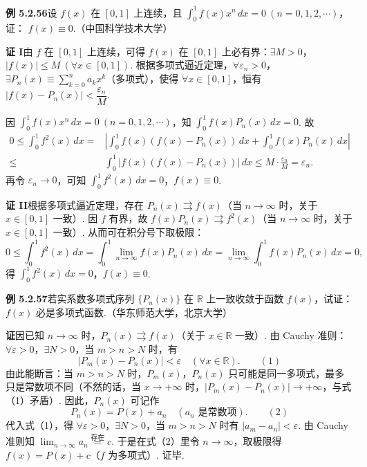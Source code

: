 \documentclass[UTF8, 12pt, fontset=fandol, oneside]{ctexart}
\begin{document}
\noindent\textbf{例 5.2.56}\quad 设 $f(x)$ 在 $[0,1]$ 上连续，且
$\displaystyle\int_0^1f(x)x^n\,dx=0\ (n=0,1,2,\cdots)$，证：
$f(x)\equiv0$.（中国科学技术大学）

\noindent\textbf{证 I}\quad 由 $f$ 在 $[0,1]$ 上连续，可得 $f(x)$ 在 $[0,1]$ 上必有界：$\exists M>0$，
$|f(x)|\le M\ (\forall x\in[0,1])$. 根据多项式逼近定理，$\forall\varepsilon_n>0$，
$\exists P_n(x)\equiv\displaystyle\sum_{k=0}^n a_kx^k$（多项式），使得 $\forall x\in[0,1]$，恒有
$|f(x)-P_n(x)|<\dfrac{\varepsilon_n}{M}$.

因 $\displaystyle\int_0^1f(x)x^n\,dx=0\ (n=0,1,2,\cdots)$，知
$\displaystyle\int_0^1f(x)P_n(x)\,dx=0$. 故
\[
\begin{aligned}
0\le\int_0^1f^2(x)\,dx
={}&\left|\int_0^1 f(x)(f(x)-P_n(x))\,dx+\int_0^1f(x)P_n(x)\,dx\right|\\
\le{}&\int_0^1|f(x)(f(x)-P_n(x))|\,dx
\le M\cdot\frac{\varepsilon_n}{M}=\varepsilon_n.
\end{aligned}
\]
再令 $\varepsilon_n\to0$，可知 $\displaystyle\int_0^1f^2(x)\,dx=0$，$f(x)\equiv0$.

\noindent\textbf{证 II}\quad 根据多项式逼近定理，存在 $P_n(x)\rightrightarrows f(x)$（当 $n\to\infty$ 时，关于
$x\in[0,1]$ 一致）. 因 $f$ 有界，故 $f(x)P_n(x)\rightrightarrows f^2(x)$（当 $n\to\infty$ 时，关于
$x\in[0,1]$ 一致）. 从而可在积分号下取极限：
\[
  0\le\int_0^1 f^2(x)\,dx
  =\int_0^1\lim_{n\to\infty}f(x)P_n(x)\,dx
  =\lim_{n\to\infty}\int_0^1f(x)P_n(x)\,dx=0,
\]
得 $\displaystyle\int_0^1f^2(x)\,dx=0$，$f(x)\equiv0$.

\noindent\textbf{例 5.2.57}\quad 若实系数多项式序列 $\{P_n(x)\}$ 在 $\mathbb R$ 上一致收敛于函数 $f(x)$，试证：
$f(x)$ 必是多项式函数.（华东师范大学，北京大学）

\noindent\textbf{证}\quad 因已知 $n\to\infty$ 时，$P_n(x)\rightrightarrows f(x)$（关于 $x\in\mathbb R$ 一致）. 由 Cauchy 准则：
$\forall\varepsilon>0$，$\exists N>0$，当 $m>n>N$ 时，有
\[
  |P_m(x)-P_n(x)|<\varepsilon\quad(\forall x\in\mathbb R).
\qquad(1)
\]
由此能断言：当 $m>n>N$ 时，$P_m(x)$，$P_n(x)$ 只可能是同一多项式，最多只是常数项不同（不然的话，当
$x\to+\infty$ 时，$|P_m(x)-P_n(x)|\to+\infty$，与式（1）矛盾）. 因此，$P_n(x)$ 可记作
\[
  P_n(x)=P(x)+a_n\quad(a_n\text{ 是常数项}).
\qquad(2)
\]
代入式（1），得 $\forall\varepsilon>0$，$\exists N>0$，当 $m>n>N$ 时有
$|a_m-a_n|<\varepsilon$. 由 Cauchy 准则知 $\displaystyle\lim_{n\to\infty}a_n\overset{\text{存在}}=c$.
于是在式（2）里令 $n\to\infty$，取极限得 $f(x)=P(x)+c$（$f$ 为多项式）. 证毕.
\end{document}

